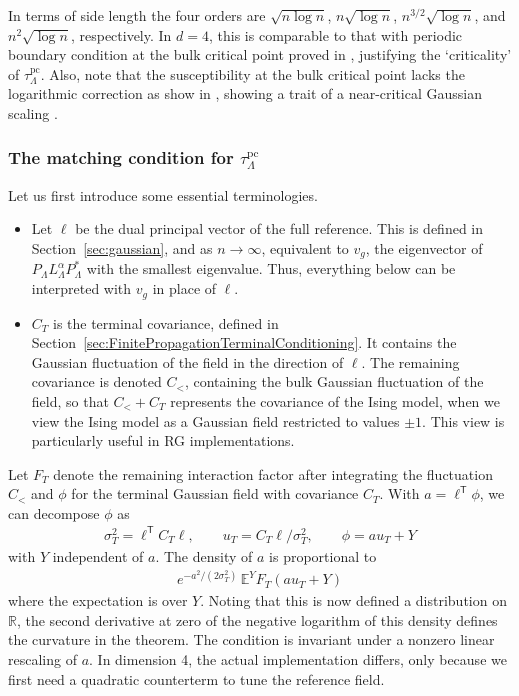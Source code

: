 \documentclass[11pt]{article}
\theoremstyle{definition}
\newcommand{\E}{\mathbb E}
\begin{document}
In terms of side length the four orders are
\(\sqrt{n\log n}\), \(n\sqrt{\log n}\),
\(n^{3/2}\sqrt{\log n}\), and \(n^2\sqrt{\log n}\), respectively.
In $d=4$, this is comparable to that with periodic boundary condition at the bulk critical point proved in \cite{TorusFSS},
justifying the `criticality' of $\tau_{\Lambda}^{\mathrm{pc}}$.
Also, note that the susceptibility at the bulk critical point lacks the logarithmic correction as show in \cite{CamiaJiangNewman2021}, 
showing a trait of a near-critical Gaussian scaling \cite[Theorem~1.9(2)]{TorusFSS}.

\subsubsection{The matching condition for $\tau^{\mathrm{pc}}_{\Lambda}$} \label{sec:TheMatchingCondition}

Let us first introduce some essential terminologies.
\begin{itemize}
\item Let \(\ell\) be the dual principal vector of the full reference. 
This is defined in Section~\ref{sec:gaussian}, and as $n \rightarrow \infty$, 
equivalent to $v_g$, the eigenvector of $P_{\Lambda} L_\Lambda^\alpha P_\Lambda^*$ 
with the smallest eigenvalue.
Thus, everything below can be interpreted with $v_g$ in place of $\ell$.
\item $C_T$ is the terminal covariance, defined in Section~\ref{sec:FinitePropagationTerminalConditioning}.
It contains the Gaussian fluctuation of the field in the direction of $\ell$.
The remaining covariance is denoted $C_{<}$, containing the bulk Gaussian fluctuation of the field, 
so that $C_{<} + C_T$ represents the covariance of the Ising model, when we view the Ising model as a Gaussian field
restricted to values $\pm 1$. This view is particularly useful in RG implementations.
\end{itemize}
\noindent
Let \(F_T\) denote the remaining interaction factor after integrating
the fluctuation $C_{<}$
and \(\phi\) for the terminal Gaussian field with covariance \(C_T\).
With \(a=\ell^{\mathsf T}\phi\), we can decompose $\phi$ as
\begin{align}
 \sigma_T^2=\ell^{\mathsf T}C_T\ell,\qquad
 u_T=C_T\ell/\sigma_T^2,\qquad
 \phi=a u_T+Y
\end{align}
with \(Y\) independent of \(a\). The density of \(a\) is proportional to
\begin{align}
  e^{-a^2/(2\sigma_T^2)}\,\E^Y F_T(a u_T+Y)
\end{align}
where the expectation is over \(Y\). Noting that this is now defined a distribution on $\mathbb{R}$,
the second derivative at zero of the negative logarithm of this density
defines the curvature in the theorem. The condition is invariant under a
nonzero linear rescaling of \(a\). 
In dimension 4, the actual implementation differs, only because
we first need a quadratic counterterm to tune the reference field.
\end{document}
